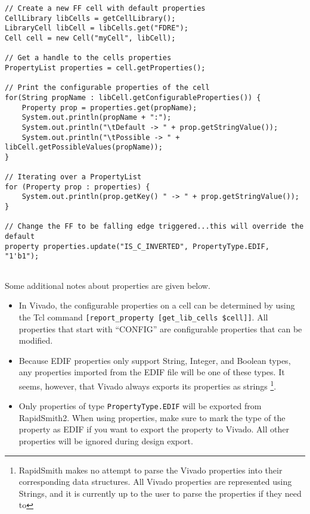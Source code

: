 \begin{lstlisting}[xleftmargin=1.5em, framexleftmargin=1.5em, caption=Using
PropertyLists in RapidSmith, label=code:properties] 
// Create a new FF cell with default properties
CellLibrary libCells = getCellLibrary();
LibraryCell libCell = libCells.get("FDRE");
Cell cell = new Cell("myCell", libCell);

// Get a handle to the cells properties
PropertyList properties = cell.getProperties();

// Print the configurable properties of the cell 
for(String propName : libCell.getConfigurableProperties()) {
	Property prop = properties.get(propName);
	System.out.println(propName + ":");
	System.out.println("\tDefault -> " + prop.getStringValue());
	System.out.println("\tPossible -> " + libCell.getPossibleValues(propName)); 
}

// Iterating over a PropertyList
for (Property prop : properties) {
	System.out.println(prop.getKey() " -> " + prop.getStringValue());
}

// Change the FF to be falling edge triggered...this will override the default
property properties.update("IS_C_INVERTED", PropertyType.EDIF, "1'b1");


\end{lstlisting}

\noindent Some additional notes about properties are given below. 

\begin{itemize}
  \item In Vivado, the configurable properties on a cell can be determined by
  using the Tcl command \texttt{[report\_property [get\_lib\_cells \$cell]]}.
  All properties that start with ``CONFIG'' are configurable properties that
  can be modified.
  
  \item Because EDIF properties only support String, Integer, and Boolean types,
  any properties imported from the EDIF file will be one of these types.
  It seems, however, that Vivado always exports its properties as strings
  \footnote{RapidSmith makes no attempt to parse the Vivado properties into
  their corresponding data structures. All Vivado properties are represented using
  Strings, and it is currently up to the user to parse the properties if they
  need to}.
 
  \item Only properties of type \texttt{PropertyType.EDIF} will be exported from
  RapidSmith2. When using properties, make sure to mark the type of the property
  as EDIF if you want to export the property to Vivado. All other properties
  will be ignored during design export.
    
\end{itemize}

